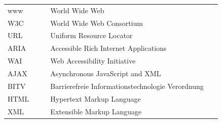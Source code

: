 \documentclass[a4paper,bibtotoc,oneside]{scrbook}
\begin{document}





\listoffigures
{} %
\newpage


\hspace{-17mm}\begin{tabular}{>{\raggedleft}p{0.2\linewidth} p{0.75\linewidth} p{0.1\linewidth}}

www & World Wide Web\\
W3C & World Wide Web Consortium\\
URL & Uniform Resource Locator\\
ARIA & Accessible Rich Internet Applications\\
WAI & Web Accessibility Initiative\\
AJAX & Asynchronous JavaScript and XML\\
BITV & Barrierefreie  Informationstechnologie Verordnung\\
HTML & Hypertext Markup Language\\
XML & Extensible Markup Language\\
\end{tabular}


\end{document}
